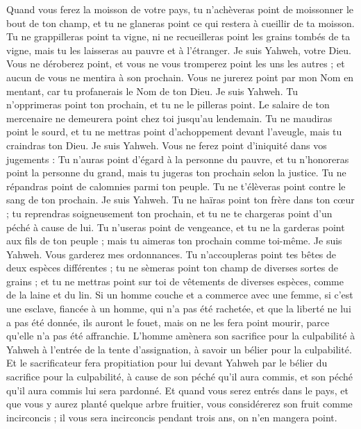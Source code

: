 \begin{multicols}{2}
Quand vous ferez la moisson de votre pays, tu n'achèveras point de moissonner le bout de ton champ, et tu ne glaneras point ce qui restera à cueillir de ta moisson.
Tu ne grappilleras point ta vigne, ni ne recueilleras point les grains tombés de ta vigne, mais tu les laisseras au pauvre et à l'étranger. Je suis Yahweh, votre Dieu.
Vous ne déroberez point, et vous ne vous tromperez point les uns les autres ; et aucun de vous ne mentira à son prochain.
Vous ne jurerez point par mon Nom en mentant, car tu profanerais le Nom de ton Dieu. Je suis Yahweh.
Tu n'opprimeras point ton prochain, et tu ne le pilleras point. Le salaire de ton mercenaire ne demeurera point chez toi jusqu'au lendemain.
Tu ne maudiras point le sourd, et tu ne mettras point d'achoppement devant l'aveugle, mais tu craindras ton Dieu. Je suis Yahweh.
Vous ne ferez point d'iniquité dans vos jugements : Tu n'auras point d'égard à la personne du pauvre, et tu n'honoreras point la personne du grand, mais tu jugeras ton prochain selon la justice.
Tu ne répandras point de calomnies parmi ton peuple. Tu ne t'élèveras point contre le sang de ton prochain. Je suis Yahweh.
Tu ne haïras point ton frère dans ton cœur ; tu reprendras soigneusement ton prochain, et tu ne te chargeras point d'un péché à cause de lui.
Tu n'useras point de vengeance, et tu ne la garderas point aux fils de ton peuple ; mais tu aimeras ton prochain comme toi-même. Je suis Yahweh.
Vous garderez mes ordonnances. Tu n'accoupleras point tes bêtes de deux espèces différentes ; tu ne sèmeras point ton champ de diverses sortes de grains ; et tu ne mettras point sur toi de vêtements de diverses espèces, comme de la laine et du lin.
Si un homme couche et a commerce avec une femme, si c'est une esclave, fiancée à un homme, qui n'a pas été rachetée, et que la liberté ne lui a pas été donnée, ils auront le fouet, mais on ne les fera point mourir, parce qu'elle n'a pas été affranchie.
L'homme amènera son sacrifice pour la culpabilité à Yahweh à l'entrée de la tente d'assignation, à savoir un bélier pour la culpabilité.
Et le sacrificateur fera propitiation pour lui devant Yahweh par le bélier du sacrifice pour la culpabilité, à cause de son péché qu'il aura commis, et son péché qu'il aura commis lui sera pardonné.
Et quand vous serez entrés dans le pays, et que vous y aurez planté quelque arbre fruitier, vous considérerez son fruit comme incirconcis ; il vous sera incirconcis pendant trois ans, on n'en mangera point.

\end{multicols}
